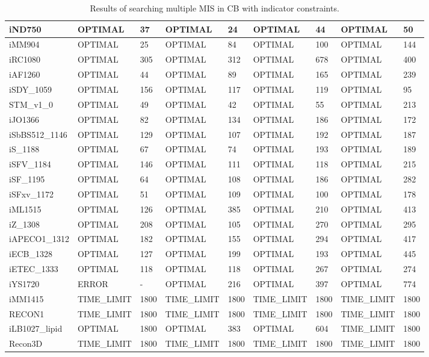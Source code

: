 \begin{table}[!ht]
\begin{tabular}{|l|l|l|l|l|l|l|l|l|}
        iND750 & OPTIMAL & 37 & OPTIMAL & 24 & OPTIMAL & 44 & OPTIMAL & 50 \\ \hline
        iMM904 & OPTIMAL & 25 & OPTIMAL & 84 & OPTIMAL & 100 & OPTIMAL & 144 \\ \hline
        iRC1080 & OPTIMAL & 305 & OPTIMAL & 312 & OPTIMAL & 678 & OPTIMAL & 400 \\ \hline
        iAF1260 & OPTIMAL & 44 & OPTIMAL & 89 & OPTIMAL & 165 & OPTIMAL & 239 \\ \hline
        iSDY\_1059 & OPTIMAL & 156 & OPTIMAL & 117 & OPTIMAL & 119 & OPTIMAL & 95 \\ \hline
        STM\_v1\_0 & OPTIMAL & 49 & OPTIMAL & 42 & OPTIMAL & 55 & OPTIMAL & 213 \\ \hline
        iJO1366 & OPTIMAL & 82 & OPTIMAL & 134 & OPTIMAL & 186 & OPTIMAL & 172 \\ \hline
        iSbBS512\_1146 & OPTIMAL & 129 & OPTIMAL & 107 & OPTIMAL & 192 & OPTIMAL & 187 \\ \hline
        iS\_1188 & OPTIMAL & 67 & OPTIMAL & 74 & OPTIMAL & 193 & OPTIMAL & 189 \\ \hline
        iSFV\_1184 & OPTIMAL & 146 & OPTIMAL & 111 & OPTIMAL & 118 & OPTIMAL & 215 \\ \hline
        iSF\_1195 & OPTIMAL & 64 & OPTIMAL & 108 & OPTIMAL & 186 & OPTIMAL & 282 \\ \hline
        iSFxv\_1172 & OPTIMAL & 51 & OPTIMAL & 109 & OPTIMAL & 100 & OPTIMAL & 178 \\ \hline
        iML1515 & OPTIMAL & 126 & OPTIMAL & 385 & OPTIMAL & 210 & OPTIMAL & 413 \\ \hline
        iZ\_1308 & OPTIMAL & 208 & OPTIMAL & 105 & OPTIMAL & 270 & OPTIMAL & 295 \\ \hline
        iAPECO1\_1312 & OPTIMAL & 182 & OPTIMAL & 155 & OPTIMAL & 294 & OPTIMAL & 417 \\ \hline
        iECB\_1328 & OPTIMAL & 127 & OPTIMAL & 199 & OPTIMAL & 193 & OPTIMAL & 445 \\ \hline
        iETEC\_1333 & OPTIMAL & 118 & OPTIMAL & 118 & OPTIMAL & 267 & OPTIMAL & 274 \\ \hline
        iYS1720 & ERROR & - & OPTIMAL & 216 & OPTIMAL & 397 & OPTIMAL & 774 \\ \hline
        iMM1415 & TIME\_LIMIT & 1800 & TIME\_LIMIT & 1800 & TIME\_LIMIT & 1800 & TIME\_LIMIT & 1800 \\ \hline
        RECON1 & TIME\_LIMIT & 1800 & TIME\_LIMIT & 1800 & TIME\_LIMIT & 1800 & TIME\_LIMIT & 1800 \\ \hline
        iLB1027\_lipid & OPTIMAL & 1800 & OPTIMAL & 383 & OPTIMAL & 604 & TIME\_LIMIT & 1800 \\ \hline
        Recon3D & TIME\_LIMIT & 1800 & TIME\_LIMIT & 1800 & TIME\_LIMIT & 1800 & TIME\_LIMIT & 1800 \\ \hline
    \end{tabular}
    \caption{\label{Tab:multiple_mis_indicator} Results of searching multiple MIS in CB with indicator constraints.}
\end{table}

